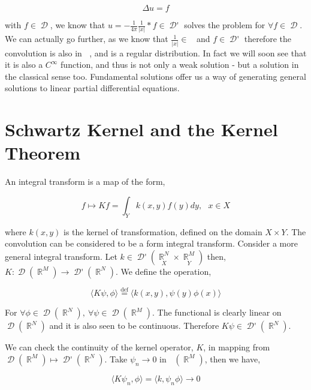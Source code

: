 \documentclass[12pt, a4]{article}
\DeclareMathOperator\reals{\mathbb{R}}
\DeclareMathOperator\tfspace{C_0^\infty}
\DeclareMathOperator\tfspaceD{\mathcal{D}}
\DeclareMathOperator\dist{\mathcal{D'}}
\DeclareMathOperator\lone{L_{\text{loc}}^1}
\begin{document}
\begin{equation}
    \Delta u = f
\end{equation}

with $f \in \tfspaceD$, we know that $u = -\frac{1}{4\pi}\frac{1}{|x|} * f \in \dist$ solves the problem for $\forall f \in \tfspaceD$. We can actually go further, as we know that $\frac{1}{|x|} \in \lone$ and $f \in \dist$ therefore the convolution is also in $\lone$, and is a regular distribution. In fact we will soon see that it is also a $C^\infty$ function, and thus is not only a weak solution - but a solution in the classical sense too. Fundamental solutions offer us a way of generating general solutions to linear partial differential equations.

\section{Schwartz Kernel and the Kernel Theorem}

An integral transform is a map of the form,

\begin{equation}
    f \mapsto Kf = \int_Y k(x, y) f(y) dy, \> \> \> x \in X
\end{equation}

where $k(x, y)$ is the kernel of transformation, defined on the domain $X \times Y$. The convolution can be considered to be a form integral transform. Consider a more general integral transform. Let $k \in \dist(\underset{X}{\reals^N} \times \underset{Y}{\reals^M})$ then, $K : \tfspaceD(\reals^M) \rightarrow \dist(\reals^N)$. We define the operation,

\begin{equation}
    \langle K \psi, \phi \rangle \overset{\text{def}}{=} \langle k(x, y), \psi(y)\phi(x) \rangle
\end{equation}

For $\forall \phi \in \tfspaceD(\reals^N), \> \forall \psi \in \tfspaceD(\reals^M)$. The functional is clearly linear on $\tfspaceD(\reals^N)$ and it is also seen to be continuous. Therefore $K\psi \in \dist(\reals^N)$.

\vspace{5pt}

We can check the continuity of the kernel operator, $K$, in mapping from $\tfspaceD(\reals^M) \mapsto \dist(\reals^N)$. Take $\psi_n \rightarrow 0$ in $\tfspace(\reals^M)$, then we have,

\begin{equation}
    \langle K \psi_n, \phi \rangle = \langle k, \psi_n\phi \rangle \rightarrow 0
\end{equation}
\end{document}
